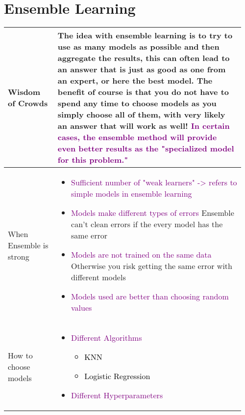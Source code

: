 \documentclass[main.tex,fontsize=8pt,paper=a4,paper=portrait,DIV=calc,]{scrartcl}
\begin{document}
\begin{table}[ht!]
\section{Ensemble Learning}
\begin{tabular}{|m{0.2\linewidth}|m{0.755\linewidth}|}
\hline
Wisdom of Crowds & 
The idea with ensemble learning is to try to use as many models as possible and then aggregate the results, this can often lead to an answer that is just as good as one from an expert, or here the best model.\newline
The benefit of course is that you do not have to spend any time to choose models as you simply choose all of them, with very likely an answer that will work as well!\newline
\textcolor{purple}{In certain cases, the ensemble method will provide even better results as the "specialized model for this problem."}\\
\hline
When Ensemble is strong & 
\vspace{2mm}
\begin{itemize}
\item \textcolor{purple}{Sufficient number of "weak learners" -> refers to simple models in ensemble learning}
\item \textcolor{purple}{Models make different types of errors}\newline
  Ensemble can't clean errors if the every model has the same error
\item \textcolor{purple}{Models are not trained on the same data}\newline
  Otherwise you risk getting the same error with different models
\item \textcolor{purple}{Models used are better than choosing random values}
\vspace{-3mm}
\end{itemize} 
\\
\hline
How to choose models & 
\begin{itemize}
\item \textcolor{purple}{Different Algorithms}\newline
  \begin{itemize}
  \item \textcolor{black}{KNN}
  \item \textcolor{black}{Logistic Regression}
  \end{itemize}  
\item \textcolor{purple}{Different Hyperparameters}\newline
  \begin{itemize}

\end{itemize}
\end{itemize}
\end{tabular}
\end{table}
\end{document}
